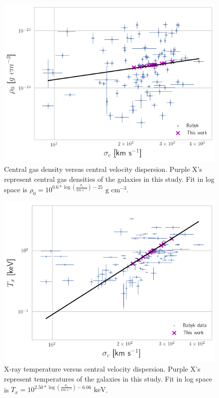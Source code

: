 \documentclass[fleqn,usenatbib,useAMS]{mnras}
\begin{document}
\begin{figure}
\vspace{20pt}%
\begin{center}
\includegraphics[width=1.0\columnwidth]{plots/rho_0_vs_sigma_with_errors.png}
\caption{Central gas density versus central velocity dispersion.  Purple X's represent central gas densities of the galaxies in this study.  Fit in log space is $\rho_0 = 10^{0.6*\log\left(\frac{\sigma_c}{km\ s^{-1}}\right) - 25} \text{  g cm}^{-3}$.}
\label{fig:rho0_vs_sigma}
\end{center}
\end{figure}

\begin{figure}
\vspace{20pt}%
\begin{center}
\includegraphics[width=1.0\columnwidth]{plots/Tx_vs_sigma_with_errors.png}
\caption{X-ray temperature versus central velocity dispersion.  Purple X's represent temperatures of the galaxies in this study.  Fit in log space is $T_x = 10^{2.50*\log\left(\frac{\sigma_c}{km\ s^{-1}}\right) - 6.06} \text{  keV}$.}
\label{fig:Tx_vs_sigma}
\end{center}
\end{figure}
\end{document}
